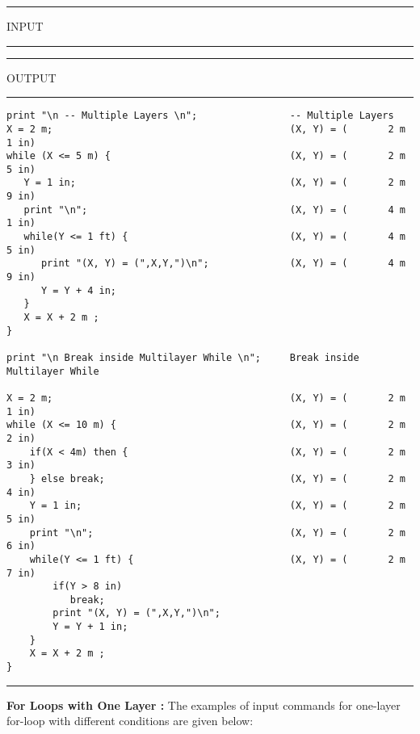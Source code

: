 \vspace{0.15 in}
\begin{footnotesize}
\noindent
\rule{1.2 in}{0.035 in} INPUT \rule{1.2 in}{0.035 in}\hspace{0.1 in}
\rule{1.3 in}{0.035 in} OUTPUT\rule{1.3 in}{0.035 in}
\begin{verbatim}
print "\n -- Multiple Layers \n";                -- Multiple Layers 
X = 2 m;                                         (X, Y) = (       2 m       1 in)
while (X <= 5 m) {                               (X, Y) = (       2 m       5 in)
   Y = 1 in;                                     (X, Y) = (       2 m       9 in)
   print "\n";                                   (X, Y) = (       4 m       1 in)
   while(Y <= 1 ft) {                            (X, Y) = (       4 m       5 in)
      print "(X, Y) = (",X,Y,")\n";              (X, Y) = (       4 m       9 in)
      Y = Y + 4 in;
   }
   X = X + 2 m ;
}

print "\n Break inside Multilayer While \n";     Break inside Multilayer While 

X = 2 m;                                         (X, Y) = (       2 m       1 in)
while (X <= 10 m) {                              (X, Y) = (       2 m       2 in)
    if(X < 4m) then {                            (X, Y) = (       2 m       3 in)
    } else break;                                (X, Y) = (       2 m       4 in)
    Y = 1 in;                                    (X, Y) = (       2 m       5 in)
    print "\n";                                  (X, Y) = (       2 m       6 in)
    while(Y <= 1 ft) {                           (X, Y) = (       2 m       7 in)
        if(Y > 8 in)
           break;
        print "(X, Y) = (",X,Y,")\n";
        Y = Y + 1 in;
    }
    X = X + 2 m ;
}
\end{verbatim}
\rule{6.25 in}{0.035 in}
\end{footnotesize}

\vspace{0.25 in}\noindent
{\bf For Loops with One Layer :}
The examples of input commands for one-layer for-loop with different
conditions are given below:

